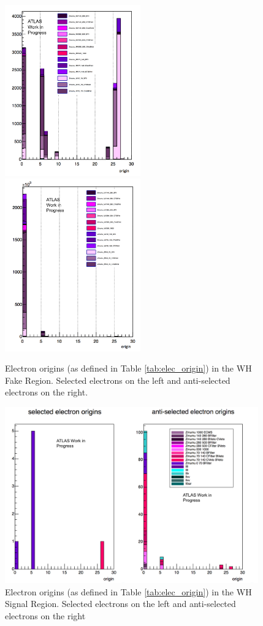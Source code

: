 \pagebreak

\begin{figure}[htb!]
        \includegraphics[width=2.3in]{figures/chapter7/selected_wh_fr.png}
        \includegraphics[width=2.3in]{figures/chapter7/wh_anti_fr.png}
    \caption{Electron origins (as defined in Table \ref{tab:elec_origin}) in the WH Fake Region. Selected electrons on the left and anti-selected electrons on the right.}
    \label{fig:wh_fr_origins}
\end{figure}

\begin{figure}[htb!]
    \centering
    \includegraphics[width=4.3in]{figures/chapter7/wh_sr_origins.png}
    \caption{Electron origins (as defined in Table \ref{tab:elec_origin}) in the WH Signal Region. Selected electrons on the left and anti-selected electrons on the right}
    \label{fig:wh_sr_orig}
\end{figure}

